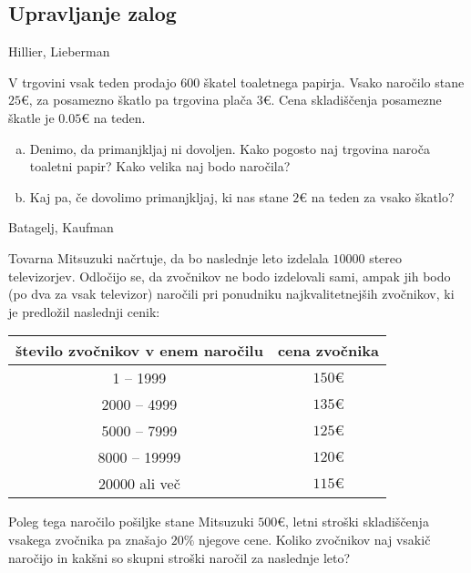 \subsection{Upravljanje zalog}

\begin{naloga}{Hillier, Lieberman}{\cite[Problem~19.3-2]{hl}}
\begin{vprasanje}
V trgovini vsak teden prodajo $600$ škatel toaletnega papirja.
Vsako naročilo stane $25 €$, za posamezno škatlo pa trgovina plača $3 €$.
Cena skladiščenja posamezne škatle je $0.05 €$ na teden.
\begin{enumerate}[(a)]
\item Denimo, da primanjkljaj ni dovoljen.
Kako pogosto naj trgovina naroča toaletni papir?
Kako velika naj bodo naročila?
\item Kaj pa, če dovolimo primanjkljaj,
ki nas stane $2 €$ na teden za vsako škatlo?
\end{enumerate}

\end{vprasanje}
\begin{odgovor}
\end{odgovor}
\end{naloga}


\begin{naloga}{Batagelj, Kaufman}{\cite[Naloga~10.7]{bk}}
\begin{vprasanje}
Tovarna Mitsuzuki načrtuje,
da bo naslednje leto izdelala $10000$ stereo televizorjev.
Odločijo se, da zvočnikov ne bodo izdelovali sami,
ampak jih bodo (po dva za vsak televizor) naročili
pri ponudniku najkvalitetnejših zvočnikov,
ki je predložil naslednji cenik:
\begin{center}
\begin{tabular}{c|c}
število zvočnikov v enem naročilu & cena zvočnika \\
\hline
1 -- 1999 & $150 €$ \\
2000 -- 4999 & $135 €$ \\
5000 -- 7999 & $125 €$ \\
8000 -- 19999 & $120 €$ \\
20000 ali več & $115 €$ \\
\end{tabular}
\end{center}
Poleg tega naročilo pošiljke stane Mitsuzuki $500 €$,
letni stroški skladiščenja vsakega zvočnika pa znašajo $20\%$ njegove cene.
Koliko zvočnikov naj vsakič naročijo
in kakšni so skupni stroški naročil za naslednje leto?

\end{vprasanje}
\begin{odgovor}
\end{odgovor}
\end{naloga}


